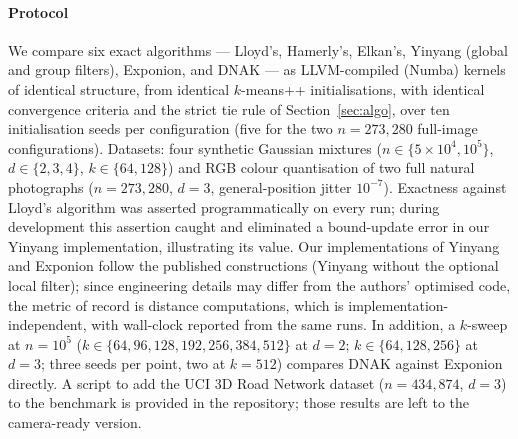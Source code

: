 \documentclass[review,12pt]{elsarticle}
\begin{document}
\paragraph{Protocol}
We compare six exact algorithms --- Lloyd's, Hamerly's, Elkan's,
Yinyang (global and group filters), Exponion, and DNAK --- as
LLVM-compiled (Numba) kernels of identical structure, from identical
$k$-means++ \cite{arthur} initialisations, with identical convergence criteria and
the strict tie rule of Section~\ref{sec:algo}, over ten initialisation
seeds per configuration (five for the two $n=273{,}280$ full-image
configurations). Datasets: four synthetic Gaussian mixtures
($n\in\{5{\times}10^4,10^5\}$, $d\in\{2,3,4\}$, $k\in\{64,128\}$) and
RGB colour quantisation of two full natural photographs
($n=273{,}280$, $d=3$, general-position jitter $10^{-7}$). Exactness
against Lloyd's algorithm was asserted programmatically on every run;
during development this assertion caught and eliminated a bound-update
error in our Yinyang implementation, illustrating its value. Our
implementations of Yinyang and Exponion follow the published
constructions (Yinyang without the optional local filter); since
engineering details may differ from the authors' optimised code, the
metric of record is distance computations, which is
implementation-independent, with wall-clock reported from the same
runs. In addition, a $k$-sweep at $n=10^5$
($k\in\{64,96,128,192,256,384,512\}$ at $d{=}2$;
$k\in\{64,128,256\}$ at $d{=}3$; three seeds per point, two at
$k{=}512$) compares DNAK against Exponion directly. A script to add
the UCI 3D Road Network dataset ($n=434{,}874$, $d=3$) to the
benchmark is provided in the repository; those results are left to the
camera-ready version.
\end{document}
